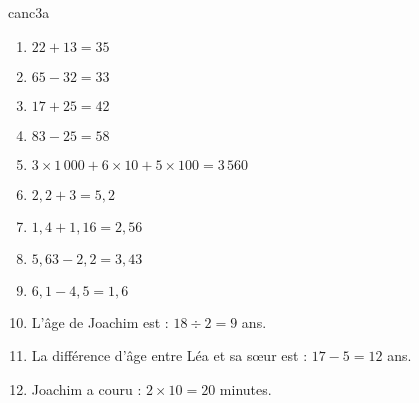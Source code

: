 \begin{EXO}{}{canc3a}
\exocorrection


    \begin{multicols}{2}

\begin{enumerate}[itemsep=1em, label=\arabic*)]
\item \begin{minipage}[t]{\linewidth}$22+13=35$\end{minipage}
\item \begin{minipage}[t]{\linewidth}$65-32=33$\end{minipage}
\item \begin{minipage}[t]{\linewidth}$17+25=42$\end{minipage}
\item \begin{minipage}[t]{\linewidth}$83-25=58$\end{minipage}
\item \begin{minipage}[t]{\linewidth}$3\times 1\,000 + 6\times 10 + 5\times 100 =3\,560$\end{minipage}
\item \begin{minipage}[t]{\linewidth}$2{,}2+3=5{,}2$\end{minipage}
\item \begin{minipage}[t]{\linewidth}$1{,}4+1{,}16=2{,}56$\end{minipage}
\item \begin{minipage}[t]{\linewidth}$5{,}63-2{,}2=3{,}43$\end{minipage}
\item \begin{minipage}[t]{\linewidth}$6{,}1-4{,}5=1{,}6$\end{minipage}
\item \begin{minipage}[t]{\linewidth}L'âge de Joachim est : $18 \div 2=9$ ans.\end{minipage}
\item \begin{minipage}[t]{\linewidth}La différence d'âge entre Léa et sa sœur est : $17-5=12$ ans.\end{minipage}
\item \begin{minipage}[t]{\linewidth}Joachim a couru : $2 \times 10=20$ minutes.\end{minipage}

\end{enumerate}
\end{multicols}
\end{EXO}
